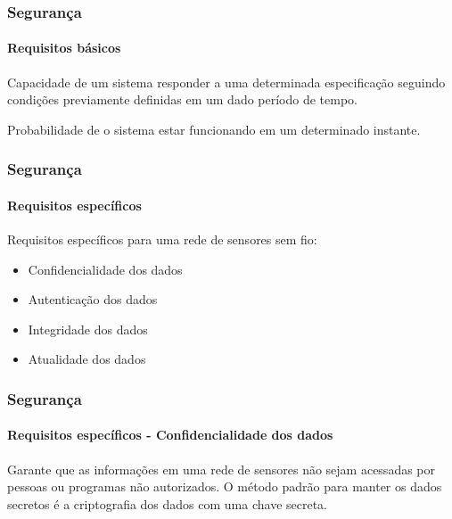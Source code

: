 \documentclass[notes]{beamer}
\begin{document}
\begin{frame}
\frametitle{Segurança}
\framesubtitle{Requisitos básicos}

\begin{block}

Capacidade de um sistema responder a uma determinada especificação seguindo condições previamente definidas em um dado período de tempo.

\end{block} \pause

\begin{block}

Probabilidade de o sistema estar funcionando em um determinado instante.

\end{block}

\end{frame}

\begin{frame}
\frametitle{Segurança}
\framesubtitle{Requisitos específicos}

\begin{block}

Requisitos específicos para uma rede de sensores sem fio: \pause

\begin{itemize}

\item Confidencialidade dos dados \pause
\item Autenticação dos dados \pause
\item Integridade dos dados \pause
\item Atualidade dos dados

\end{itemize}

\end{block} 

\end{frame}

\begin{frame}
\frametitle{Segurança}
\framesubtitle{Requisitos específicos - Confidencialidade dos dados}

\begin{block}

Garante que as informações em uma rede de sensores não sejam acessadas por pessoas ou programas não autorizados. O método padrão para manter os dados secretos é a criptografia dos dados com uma chave secreta.

\end{block} 

\end{frame}
\end{document}
